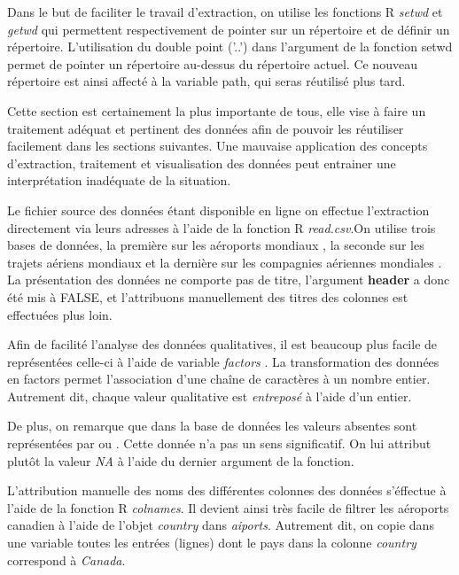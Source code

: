 \documentclass{report}
\begin{document}
Dans le but de faciliter le travail d'extraction, on utilise les fonctions R \textit{setwd} et \textit{getwd} qui permettent respectivement de pointer sur un répertoire et de définir un répertoire. L'utilisation du double point ('..') dans l'argument de la fonction setwd permet de pointer un répertoire au-dessus du répertoire actuel. Ce nouveau répertoire est ainsi affecté à la variable path, qui seras réutilisé plus tard.

%


Cette section est certainement la plus importante de tous, elle vise à faire un traitement adéquat et pertinent des données afin de pouvoir les réutiliser facilement dans les sections suivantes. Une mauvaise application des concepts d’extraction, traitement et visualisation des données peut entrainer une interprétation inadéquate de la situation.

Le fichier source des données étant disponible en ligne on effectue l'extraction directement via leurs adresses à l'aide de la fonction R \textit{read.csv}.On utilise trois bases de données, la première sur les aéroports mondiaux \cite{Data:AirportWorlwide}, la seconde sur les trajets aériens mondiaux \cite{Data:RouteWorlwide} et la dernière sur les compagnies aériennes mondiales \cite{Data:AirlineWorldwide}. La présentation des données ne comporte pas de titre, l'argument \textbf{header} a donc été mis à FALSE, et l'attribuons manuellement des titres des colonnes est effectuées plus loin. 

Afin de facilité l'analyse des données qualitatives, il est beaucoup plus facile de représentées celle-ci à l'aide de variable \textit{factors} \cite{Rfunction:as.factor}. La transformation des données en factors permet l'association d'une chaîne de caractères à un nombre entier. Autrement dit, chaque valeur qualitative est \emph{entreposé} à l'aide d'un entier.

De plus, on remarque que dans la base de données les valeurs absentes sont représentées par  ou . Cette donnée n'a pas un sens significatif. On lui attribut plutôt la valeur \textit{NA} à l'aide du dernier argument de la fonction.

L'attribution manuelle des noms des différentes colonnes des données s'éffectue à l'aide de la fonction R \textit{colnames}. Il devient ainsi très facile de filtrer les aéroports canadien à l'aide de l'objet \emph{country} dans \emph{aiports}. Autrement dit, on copie dans une variable toutes les entrées (lignes) dont le pays dans la colonne \emph{country} correspond à \emph{Canada}.
%
%
\end{document}
